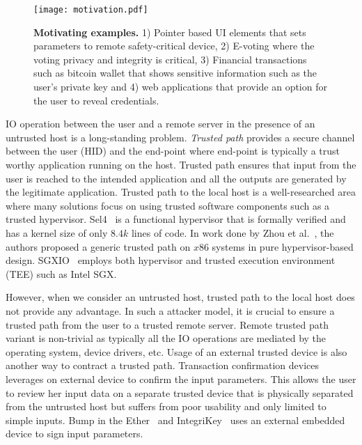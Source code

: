 \begin{figure}[t]
\centering
\texttt{[image: motivation.pdf]}
\caption{\textbf{Motivating examples.} 1) Pointer based UI elements that sets parameters to remote safety-critical device, 2) E-voting where the voting privacy and integrity is critical, 3) Financial transactions such as bitcoin wallet that shows sensitive information such as the user's private key and 4) web applications that provide an option for the user to reveal credentials.}
\spacesave
\label{fig:motivation}
\centering
\end{figure}


IO operation between the user and a remote server in the presence of an untrusted host is a long-standing problem. \emph{Trusted path} provides a secure channel between the user (HID) and the end-point where end-point is typically a trust worthy application running on the host. Trusted path ensures that input from the user is reached to the intended application and all the outputs are generated by the legitimate application. Trusted path to the local host is a well-researched area where many solutions focus on using trusted software components such as a trusted hypervisor. Sel4~\cite{klein2009sel4} is a functional hypervisor that is formally verified and has a kernel size of only $8.4k$ lines of code. In work done by Zhou et al.~\cite{zhou2012building}, the authors proposed a generic trusted path on $x86$ systems in pure hypervisor-based design. SGXIO~\cite{weiser2017sgxio} employs both hypervisor and trusted execution environment (TEE) such as Intel SGX. %

However, when we consider an untrusted host, trusted path to the local host does not provide any advantage. In such a attacker model, it is crucial to ensure a trusted path from the user to a trusted remote server. Remote trusted path variant is non-trivial as typically all the IO operations are mediated by the operating system, device drivers, etc. Usage of an external trusted device is also another way to contract a trusted path. Transaction confirmation devices~\cite{filyanov2011uni,weigold2011secure} leverages on external device to confirm the input parameters. This allows the user to review her input data on a separate trusted device that is physically separated from the untrusted host but suffers from poor usability and only limited to simple inputs. Bump in the Ether~\cite{McCPerRei2006} and IntegriKey~\cite{IntegriKey} uses an external embedded device to sign input parameters.

